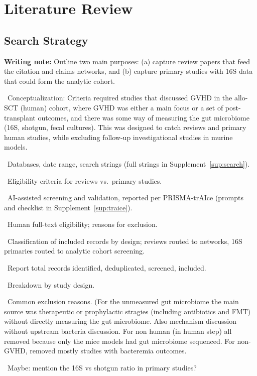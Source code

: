 \documentclass[11pt,a4paper]{article}
\newcommand{\todoitem}[1]{\par\noindent\textcolor{blue!70!black}{\textbullet~#1}}
\newcommand{\writingnote}[1]{\par\medskip\noindent\colorbox{yellow!30}{\parbox{\dimexpr\linewidth-2\fboxsep}{%
  \small\textbf{Writing note:} #1}}\par\medskip}
\begin{document}
\section{Literature Review}
\label{sec:litreview}

\subsection{Search Strategy}
\label{sec:search}
\writingnote{Outline two main purposes: (a) capture review papers that feed the citation and claims networks, and (b) capture primary studies with 16S data that could form the analytic cohort.}
\todoitem{Conceptualization: Criteria required studies that discussed GVHD in the allo-SCT (human) cohort, where GVHD was either a main focus or a set of post-transplant outcomes, and there was some way of measuring the gut microbiome (16S, shotgun, fecal cultures). This was designed to catch reviews and primary human studies, while excluding follow-up investigational studies in murine models.}
\todoitem{Databases, date range, search strings (full strings in Supplement~\ref{sup:search}).}
\todoitem{Eligibility criteria for reviews vs.\ primary studies.}
\todoitem{AI-assisted screening and validation, reported per PRISMA-trAIce (prompts and checklist in Supplement~\ref{sup:traice}).}
\todoitem{Human full-text eligibility; reasons for exclusion.}
\todoitem{Classification of included records by design; reviews routed to networks, 16S primaries routed to analytic cohort screening.}
\todoitem{Report total records identified, deduplicated, screened, included.}
\todoitem{Breakdown by study design.}
\todoitem{Common exclusion reasons. (For the unmeasured gut microbiome the main source was therapeutic or prophylactic stragies (including antibiotics and FMT) without directly measuring the gut microbiome. Also mechanism discussion without upstream bacteria discussion. For non human (in human step) all removed because only the mice models had gut microbiome sequenced. For non-GVHD, removed mostly studies with bacteremia outcomes. }
\todoitem{Maybe: mention the 16S vs shotgun ratio in primary studies?}
\end{document}
